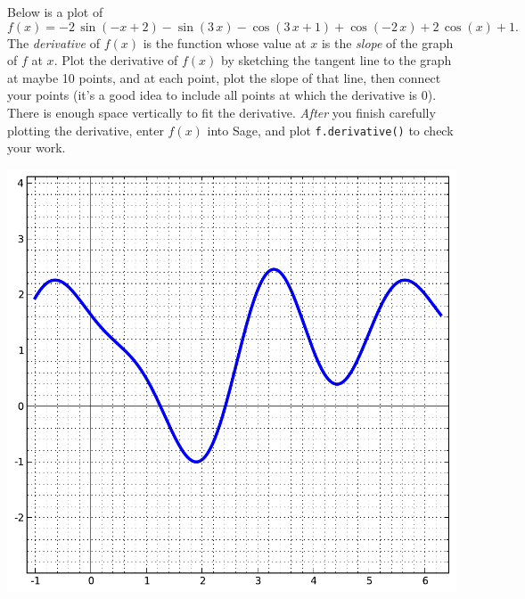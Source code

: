 Below is a plot of $$f(x)=-2 \, \sin\left(-x + 2\right) - \sin\left(3 \, x\right) - \cos\left(3 \, x + 1\right) + \cos\left(-2 \, x\right) + 2 \, \cos\left(x\right) + 1.$$  The {\em \color{red}derivative} of $f(x)$ is the function whose value at $x$ is the {\em slope} of the graph of $f$ at $x$.  Plot the derivative of $f(x)$ by sketching the tangent line to the graph at maybe 10 points, and at each point, plot the slope of that line, then connect your points (it's a good idea to include all points at which the derivative is 0).  There is enough space vertically to fit the derivative.  {\em After} you finish carefully plotting the derivative, enter $f(x)$ into Sage, and plot {\color{blue}\verb|f.derivative()|} to check your work.
\begin{center}\includegraphics{functions/53.pdf}\end{center}\newpage

